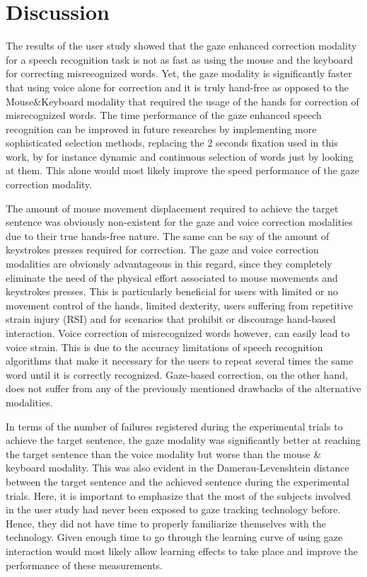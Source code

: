 \documentclass[]{article}
\begin{document}
\section{Discussion}
The results of the user study showed that the gaze enhanced correction modality for a speech recognition task is not as
fast as using the mouse and the keyboard for correcting misrecognized words. Yet, the gaze modality is significantly
faster that using voice alone for correction and it is truly hand-free as opposed to the Mouse\&Keyboard modality that
required the usage of the hands for correction of misrecognized words. The time performance of the gaze enhanced speech
recognition can be improved in future researches by implementing more sophisticated selection methods, replacing the 2
seconds fixation used in this work, by for instance dynamic and continuous selection of words just by looking at them. 
This alone would most likely improve the speed performance of the gaze correction modality.


The amount of mouse movement displacement required to achieve the target sentence was obviously non-existent for the gaze and
voice correction modalities due to their true hands-free nature. The same can be say of the amount of keystrokes presses
required for correction. The gaze and voice correction modalities are obviously advantageous in this regard, since they
completely eliminate the need of the physical effort associated to mouse movements and keystrokes presses. This is particularly
beneficial for users with limited or no movement control of the hands, limited dexterity, users suffering from
repetitive strain injury (RSI) and for scenarios that prohibit or discourage hand-based interaction. Voice correction of
misrecognized words however, can easily lead to voice strain. This is due to the accuracy limitations of speech
recognition algorithms that make it necessary for the users to repeat several times the same word until it is correctly
recognized. Gaze-based correction, on the other hand, does not suffer from any of the previously mentioned drawbacks of
the alternative modalities.


In terms of the number of failures registered during the experimental trials to achieve the target sentence, the gaze
modality was significantly better at reaching the target sentence than the voice modality but worse than the mouse \&
keyboard modality. This was also evident in the Damerau-Levenshtein distance between the target sentence and the
achieved sentence during the experimental trials. Here, it is important to emphasize that the most of the subjects
involved in the user study had never been exposed to gaze tracking technology before. Hence, they did not have time to
properly familiarize themselves with the technology. Given enough time to go through the learning curve of using gaze
interaction would most likely allow learning effects to take place and improve the performance of these measurements.
\end{document}

